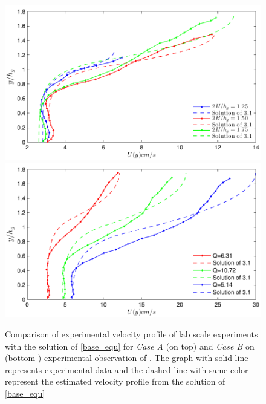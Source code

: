 \documentclass[12pt]{report}   %
\begin{document}
\begin{figure}
 {\includegraphics[]{Vivoni_Fig3_6_zero_shear_match}\\
 \includegraphics{Vivoni_Fig3_7_zero_shear_match}}
 \caption{Comparison of experimental velocity profile of lab scale experiments with the solution of \eqref{base_equ} for \textit{Case A } (on top) and \textit{Case B} on (bottom ) experimental observation of \cite{Vivoni98}. The graph with solid line represents experimental data and the dashed line with same color represent the estimated velocity profile from the solution of \eqref{base_equ}  }
 \label{VivoniFig}
\end{figure}
\end{document}
